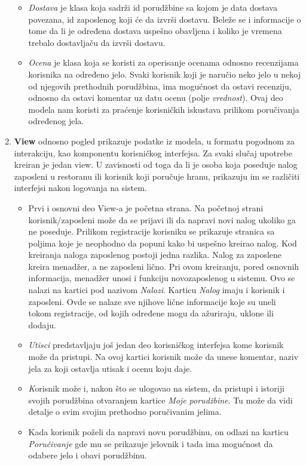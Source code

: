\begin{enumerate}
\begin{itemize}
         \item \emph{Dostava} je klasa koja sadrži id porudžbine sa kojom je data dostava povezana, id zaposlenog koji će da izvrši dostavu. Beleže se i informacije o tome da li je određena dostava uspešno obavljena i koliko je vremena trebalo dostavljaču da izvrši dostavu. 
         \item \emph{Ocena} je klasa koja se koristi za operisanje ocenama odnosno recenzijama korisnika na određeno jelo. Svaki korisnik koji je naručio neko jelo u nekoj od njegovih prethodnih porudžbina, ima mogućnost da ostavi recenziju, odnosno da ostavi komentar uz datu ocenu (polje \emph{vrednost}). Ovaj deo modela nam koristi za praćenje korisničkih iskustava prilikom poručivanja određenog jela.
    \end{itemize}
    \item \textbf{View} odnosno pogled prikazuje podatke iz modela, u formatu pogodnom za interakciju, kao komponentu korisničkog interfejsa. Za svaki slučaj upotrebe kreiran je jedan view. U zavisnosti od toga da li je osoba koja poseduje nalog zaposleni u restoranu ili korisnik koji poručuje hranu, prikazuju im se različiti interfejsi nakon logovanja na sistem. 
    \begin{itemize} 
    \item Prvi i osnovni deo View-a je početna strana. Na početnoj strani korisnik/zaposleni može da se prijavi ili da napravi novi nalog ukoliko ga ne poseduje. Prilikom registracije korisniku se prikazuje stranica sa poljima koje je neophodno da popuni kako bi uspešno kreirao nalog. Kod kreiranja naloga zaposlenog postoji jedna razlika. Nalog za zaposlene kreira menadžer, a ne zaposleni lično. Pri ovom kreiranju, pored osnovnih informacija, menadžer unosi i funkciju novozaposlenog u sistemu. Ovo se nalazi na kartici pod nazivom \emph{Nalozi}. Karticu \emph{Nalog} imaju i korisnik i zaposleni. Ovde se nalaze sve njihove lične informacije koje su uneli tokom registracije, od kojih određene mogu da ažuriraju, uklone ili dodaju.
    \item \emph{Utisci} predstavljaju još jedan deo korisničkog interfejsa kome korisnik može da pristupi. Na ovoj kartici korisnik može da unese komentar, naziv jela za koji ostavlja utisak i ocenu koju daje.
    \item \emph Korisnik može i, nakon što se ulogovao na sistem, da pristupi i istoriji svojih porudžbina otvaranjem kartice \emph{Moje porudžbine}. Tu može da vidi detalje o svim svojim prethodno poručivanim jelima.
    \item Kada korisnik poželi da napravi novu porudžbinu, on odlazi na karticu \emph{Poručivanje} gde mu se prikazuje jelovnik i tada ima mogućnost da odabere jelo i obavi porudžbinu.
    

\end{itemize}
\end{enumerate}
